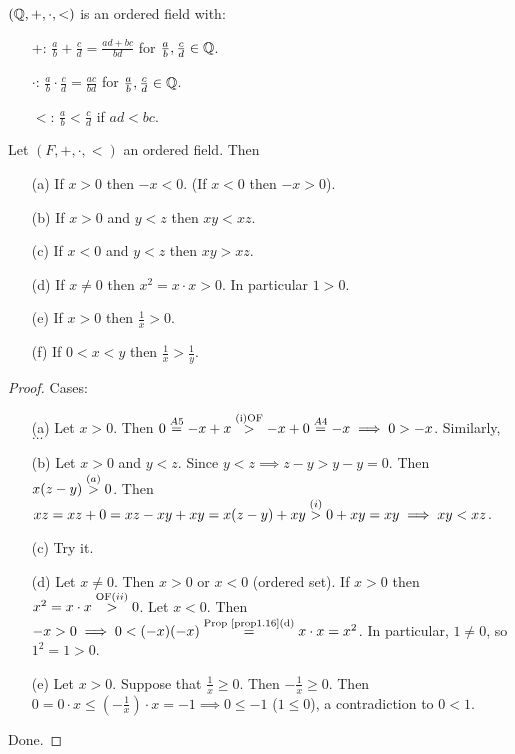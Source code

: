 \documentclass[]{article}
\begin{document}
\begin{example}
	$(\mathbb{Q},+,\cdot,<)$ is an ordered field with:
	\begin{enumerate}
		\item[+:] $\frac{a}{b} + \frac{c}{d} = \frac{ad+bc}{bd}$ for $\frac{a}{b},\frac{c}{d}\in\mathbb{Q}$.
		\item[$\cdot$:] $\frac{a}{b}\cdot\frac{c}{d} = \frac{ac}{bd}$ for $\frac{a}{b},\frac{c}{d}\in\mathbb{Q}$.
		\item[$<$:] $\frac{a}{b}<\frac{c}{d}$ if $ad<bc$.
	\end{enumerate}
\end{example}

\begin{proposition}
	Let $(F,+,\cdot,<)$ an ordered field. Then
	\begin{enumerate}
		\item[(a)] If $x>0$ then $-x<0$. (If $x<0$ then $-x>0$).
		\item[(b)] If $x>0$ and $y<z$ then $xy<xz$.
		\item[(c)] If $x<0$ and $y<z$ then $xy>xz$.
		\item[(d)] If $x\neq 0$ then $x^2 = x\cdot x >0$. In particular $1>0$.
		\item[(e)] If $x> 0$ then $\frac{1}{x}>0$.
		\item[(f)] If $0<x<y$ then $\frac{1}{x}>\frac{1}{y}$.
	\end{enumerate}
\end{proposition}
\begin{proof}
	Cases:
	\begin{enumerate}
		\item[(a)] Let $x>0$. Then $0 \overset{A5}{=} -x + x \overset{\text{(i)OF}}{>} -x+0 \overset{A4}{=} -x \implies 0>-x$. Similarly, $\dots$
		\item[(b)] Let $x>0$ and $y<z$. Since $y<z\implies z-y >y-y = 0$. Then $x(z-y) \overset{(a)}{>} 0$. Then $xz = xz + 0 = xz - xy + xy = x(z-y) + xy \overset{(i)}{>} 0 + xy = xy \implies xy <xz$.
		\item[(c)] Try it.
		\item[(d)] Let $x\neq 0$. Then $x>0$ or $x<0$ (ordered set). If $x>0$ then $x^2 = x\cdot x \overset{\text{OF}(ii)}{>}0$. Let $x<0$. Then $-x>0 \implies 0<(-x)(-x) \overset{\text{Prop \ref{prop1.16}(d)}}{=} x\cdot x = x^2$. In particular, $1\neq 0$, so $1^2 = 1 >0$.
		\item[(e)] Let $x>0$. Suppose that $\frac{1}{x}\geq 0$. Then $-\frac{1}{x}\geq 0$. Then $0 = 0\cdot x \leq (-\frac{1}{x})\cdot x = -1 \implies 0\leq -1$ ($1\leq 0$), a contradiction to $0<1$.
	\end{enumerate}
	Done.
\end{proof}
\end{document}
